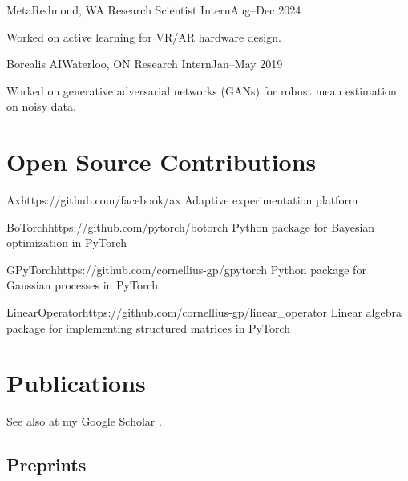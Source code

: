 \documentclass{article}
\begin{document}
\begin{work}
  {Meta}{Redmond, WA}
  {Research Scientist Intern}{Aug--Dec 2024}
  \begin{compactList}
  \item Worked on active learning for VR/AR hardware design.
  \end{compactList}
\end{work}

\begin{work}
  {Borealis AI}{Waterloo, ON}
  {Research Intern}{Jan--May 2019}
  \begin{compactList}
  \item Worked on generative adversarial networks (GANs) for robust mean estimation on noisy data.
  \end{compactList}
\end{work}

\section{Open Source Contributions}
\begin{opensource}[]
  {Ax}{https://github.com/facebook/ax}
  {Adaptive experimentation platform}
\end{opensource}

\begin{opensource}
  {BoTorch}{https://github.com/pytorch/botorch}
  {Python package for Bayesian optimization in PyTorch}
\end{opensource}

\begin{opensource}
  {GPyTorch}{https://github.com/cornellius-gp/gpytorch}
  {Python package for Gaussian processes in PyTorch}
\end{opensource}

\begin{opensource}
  {LinearOperator}{https://github.com/cornellius-gp/linear_operator}
  {Linear algebra package for implementing structured matrices in PyTorch}
\end{opensource}

\nocite{*}

\section{Publications}
See also at my Google Scholar
\href{https://scholar.google.com/citations?hl=en&user=8e0BclUAAAAJ}{\faGraduationCap}.

\subsection{Preprints}
\newrefcontext[labelprefix=P]
\printbibliography[type=unpublished, heading=none]
\end{document}
